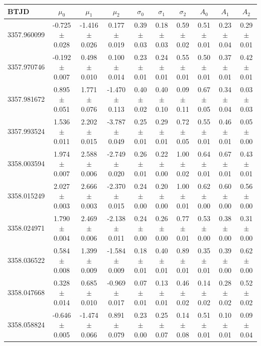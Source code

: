 \documentclass{nature3}
\begin{document}
\begin{methods}
\begin{table}
  \footnotesize
  \centering
  \begin{tabular}{lccccccccc}
  \hline
  BTJD & $\mu_0$ & $\mu_1$ & $\mu_2$ & $\sigma_0$ & $\sigma_1$ & $\sigma_2$ & $A_0$ & $A_1$ & $A_2$ \\
  \hline
  3357.960099 & -0.725 $\pm$ 0.028 & -1.416 $\pm$ 0.026 & 0.177 $\pm$ 0.019 & 0.39 $\pm$ 0.03 & 0.18 $\pm$ 0.03 & 0.59 $\pm$ 0.02 & 0.51 $\pm$ 0.01 & 0.23 $\pm$ 0.04 & 0.29 $\pm$ 0.01 \\
  3357.970746 & -0.192 $\pm$ 0.007 & 0.498 $\pm$ 0.010 & 0.100 $\pm$ 0.014 & 0.23 $\pm$ 0.01 & 0.24 $\pm$ 0.01 & 0.55 $\pm$ 0.01 & 0.50 $\pm$ 0.01 & 0.37 $\pm$ 0.01 & 0.42 $\pm$ 0.01 \\
  3357.981672 & 0.895 $\pm$ 0.051 & 1.771 $\pm$ 0.076 & -1.470 $\pm$ 0.113 & 0.40 $\pm$ 0.02 & 0.40 $\pm$ 0.10 & 0.09 $\pm$ 0.11 & 0.67 $\pm$ 0.05 & 0.34 $\pm$ 0.04 & 0.03 $\pm$ 0.03 \\
  3357.993524 & 1.536 $\pm$ 0.011 & 2.202 $\pm$ 0.015 & -3.787 $\pm$ 0.049 & 0.25 $\pm$ 0.01 & 0.29 $\pm$ 0.01 & 0.72 $\pm$ 0.05 & 0.55 $\pm$ 0.01 & 0.46 $\pm$ 0.01 & 0.05 $\pm$ 0.00 \\
  3358.003594 & 1.974 $\pm$ 0.007 & 2.588 $\pm$ 0.006 & -2.749 $\pm$ 0.020 & 0.26 $\pm$ 0.01 & 0.22 $\pm$ 0.00 & 1.00 $\pm$ 0.02 & 0.64 $\pm$ 0.01 & 0.67 $\pm$ 0.01 & 0.43 $\pm$ 0.01 \\
  3358.015249 & 2.027 $\pm$ 0.003 & 2.666 $\pm$ 0.003 & -2.370 $\pm$ 0.015 & 0.24 $\pm$ 0.00 & 0.20 $\pm$ 0.00 & 1.00 $\pm$ 0.01 & 0.62 $\pm$ 0.00 & 0.60 $\pm$ 0.00 & 0.56 $\pm$ 0.00 \\
  3358.024971 & 1.790 $\pm$ 0.004 & 2.469 $\pm$ 0.006 & -2.138 $\pm$ 0.011 & 0.24 $\pm$ 0.00 & 0.26 $\pm$ 0.00 & 0.77 $\pm$ 0.01 & 0.53 $\pm$ 0.00 & 0.38 $\pm$ 0.00 & 0.31 $\pm$ 0.00 \\
  3358.036522 & 0.584 $\pm$ 0.008 & 1.399 $\pm$ 0.009 & -1.584 $\pm$ 0.009 & 0.18 $\pm$ 0.01 & 0.40 $\pm$ 0.01 & 0.89 $\pm$ 0.01 & 0.35 $\pm$ 0.01 & 0.39 $\pm$ 0.00 & 0.62 $\pm$ 0.00 \\
  3358.047668 & 0.328 $\pm$ 0.014 & 0.685 $\pm$ 0.010 & -0.969 $\pm$ 0.017 & 0.07 $\pm$ 0.01 & 0.13 $\pm$ 0.01 & 0.46 $\pm$ 0.02 & 0.14 $\pm$ 0.02 & 0.28 $\pm$ 0.02 & 0.52 $\pm$ 0.02 \\
  3358.058824 & -0.646 $\pm$ 0.005 & -1.474 $\pm$ 0.066 & 0.891 $\pm$ 0.079 & 0.23 $\pm$ 0.00 & 0.25 $\pm$ 0.07 & 0.14 $\pm$ 0.08 & 0.51 $\pm$ 0.01 & 0.10 $\pm$ 0.01 & 0.09 $\pm$ 0.04 \\

\end{tabular}
\end{table}
\end{methods}
\end{document}

